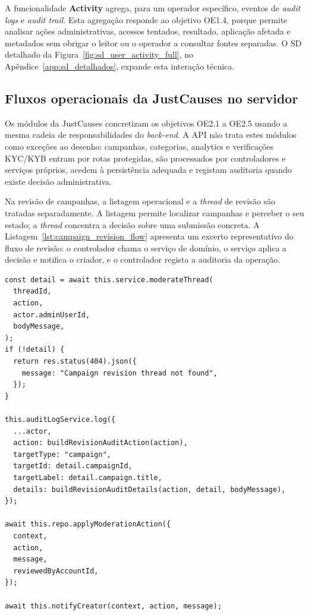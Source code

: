 A funcionalidade \textbf{Activity} agrega, para um operador específico, eventos de \textit{audit logs} e \textit{audit trail}. Esta agregação responde ao objetivo OE1.4, porque permite analisar ações administrativas, acessos tentados, resultado, aplicação afetada e metadados sem obrigar o leitor ou o operador a consultar fontes separadas. O SD detalhado da Figura~\ref{fig:sd_user_activity_full}, no Apêndice~\ref{app:sd_detalhados}, expande esta interação técnica.

\subsection{Fluxos operacionais da JustCauses no servidor}
\label{sec:modulos_ojc}

Os módulos da JustCauses concretizam os objetivos OE2.1 a OE2.5 usando a mesma cadeia de responsabilidades do \textit{back-end}. A \gls{API} não trata estes módulos como exceções ao desenho: campanhas, categorias, analytics e verificações KYC/KYB entram por rotas protegidas, são processados por controladores e serviços próprios, acedem à persistência adequada e registam auditoria quando existe decisão administrativa.

Na revisão de campanhas, a listagem operacional e a \textit{thread} de revisão são tratadas separadamente. A listagem permite localizar campanhas e perceber o seu estado; a \textit{thread} concentra a decisão sobre uma submissão concreta. A Listagem~\ref{lst:campaign_revision_flow} apresenta um excerto representativo do fluxo de revisão: o controlador chama o serviço de domínio, o serviço aplica a decisão e notifica o criador, e o controlador regista a auditoria da operação.

\begin{lstlisting}[float, caption={Excerto do fluxo de revisão de campanha}, label={lst:campaign_revision_flow}]
const detail = await this.service.moderateThread(
  threadId,
  action,
  actor.adminUserId,
  bodyMessage,
);
if (!detail) {
  return res.status(404).json({
    message: "Campaign revision thread not found",
  });
}

this.auditLogService.log({
  ...actor,
  action: buildRevisionAuditAction(action),
  targetType: "campaign",
  targetId: detail.campaignId,
  targetLabel: detail.campaign.title,
  details: buildRevisionAuditDetails(action, detail, bodyMessage),
});

await this.repo.applyModerationAction({
  context,
  action,
  message,
  reviewedByAccountId,
});

await this.notifyCreator(context, action, message);
\end{lstlisting}

